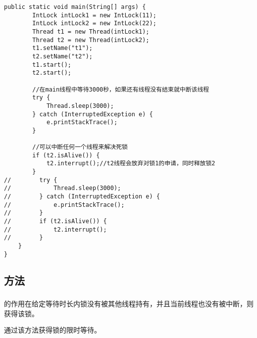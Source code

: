\documentclass[a4paper]{report}
\begin{document}
\begin{Verbatim}[frame=single,numbersep=5pt,xleftmargin=1.5em,xrightmargin=1.5em]
    public static void main(String[] args) {
        IntLock intLock1 = new IntLock(11);
        IntLock intLock2 = new IntLock(22);
        Thread t1 = new Thread(intLock1);
        Thread t2 = new Thread(intLock2);
        t1.setName("t1");
        t2.setName("t2");
        t1.start();
        t2.start();

        //在main线程中等待3000秒，如果还有线程没有结束就中断该线程
        try {
            Thread.sleep(3000);
        } catch (InterruptedException e) {
            e.printStackTrace();
        }

        //可以中断任何一个线程来解决死锁
        if (t2.isAlive()) {
            t2.interrupt();//t2线程会放弃对锁1的申请，同时释放锁2
        }
//        try {
//            Thread.sleep(3000);
//        } catch (InterruptedException e) {
//            e.printStackTrace();
//        }
//        if (t2.isAlive()) {
//            t2.interrupt();
//        }
    }
}\end{Verbatim}
\subsection{方法}
\subsubsection{}
的作用在给定等待时长内锁没有被其他线程持有，并且当前线程也没有被中断，则获得该锁。

通过该方法获得锁的限时等待。
\end{document}
